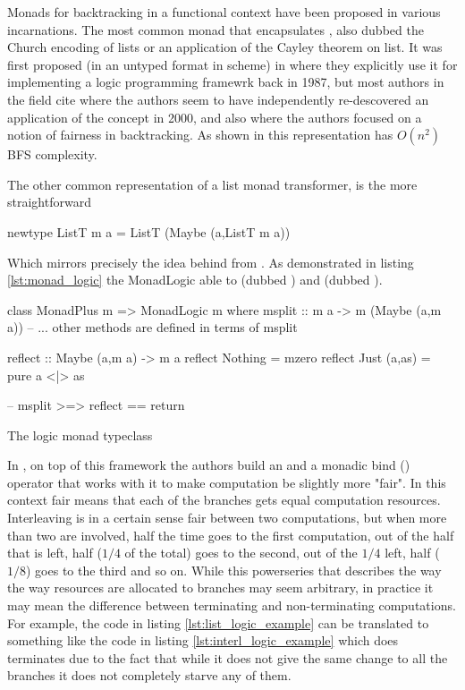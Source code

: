 Monads for backtracking in a functional context have been proposed in
various incarnations.  The most common monad that encapsulates
, also
dubbed the Church encoding of lists or an application of the Cayley
theorem on list. It was first proposed (in an untyped format in scheme) in
\cite{haynesLogicContinuations1987} where they explicitly use it for implementing 
a logic programming framewrk back in 1987, but most authors in the field cite
\cite{hinzeDerivingBacktrackingMonad2000a} where the authors seem to have
independently re-descovered an application of the concept in 2000, and also
\cite{kiselyovBacktrackingInterleavingTerminating} where the authors focused on a
notion of fairness in backtracking. As shown in
\cite{kidneyAlgebrasWeightedSearch2021} this representation has
\(O(n^2)\) BFS complexity.

The other common representation of a list monad transformer, is the more
straightforward

\begin{haskellcode}
newtype ListT m a = ListT (Maybe (a,ListT m a))
\end{haskellcode}

Which mirrors precisely the idea behind  from
\cite{kiselyovBacktrackingInterleavingTerminating}. As demonstrated in
listing \ref{lst:monad_logic} the MonadLogic able to  (dubbed )
and  (dubbed ).

\begin{code}
\begin{haskellcode}
class MonadPlus m => MonadLogic m where
  msplit :: m a -> m (Maybe (a,m a))
  -- ... other methods are defined in terms of msplit

reflect :: Maybe (a,m a) -> m a
reflect Nothing = mzero
reflect Just (a,as) = pure a <|> as

-- msplit >=> reflect == return
\end{haskellcode}
  \caption{\label{lst:monad_logic}The logic monad typeclass}
\end{code}

In \cite{kiselyovBacktrackingInterleavingTerminating}, on top of this
framework the authors build an  and a monadic bind
(\hask{>>-}) operator that works with it to make computation be
slightly more "fair". In this context fair means that each of the branches 
gets equal computation resources. Interleaving is in a certain sense 
fair between two computations, but when more than two are involved, 
half the time goes to the first
computation, out of the half that is left, half (\(1/4\) of the total)
goes to the second, out of the \(1/4\) left, half (\(1/8\)) goes to
the third and so on. While this powerseries that describes the way the
way resources are allocated to branches may seem arbitrary, in
practice it may mean the difference between terminating and
non-terminating computations. For example, the code in listing
\ref{lst:list_logic_example} can be translated to something like the
code in listing \ref{lst:interl_logic_example} which does terminates
due to the fact that while it does not give the same change to all the
branches it does not completely starve any of them.

